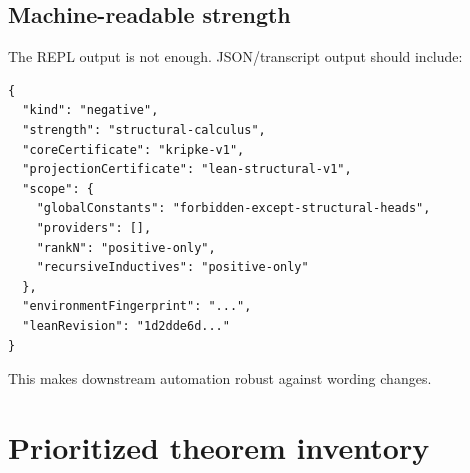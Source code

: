 \documentclass[11pt,letterpaper,openany]{report}
\theoremstyle{definition}
\theoremstyle{remark}
\begin{document}
\section{Machine-readable strength}

The REPL output is not enough. JSON/transcript output should include:

\begin{lstlisting}[caption={Illustrative result strength metadata.}]
{
  "kind": "negative",
  "strength": "structural-calculus",
  "coreCertificate": "kripke-v1",
  "projectionCertificate": "lean-structural-v1",
  "scope": {
    "globalConstants": "forbidden-except-structural-heads",
    "providers": [],
    "rankN": "positive-only",
    "recursiveInductives": "positive-only"
  },
  "environmentFingerprint": "...",
  "leanRevision": "1d2dde6d..."
}
\end{lstlisting}

This makes downstream automation robust against wording changes.

\chapter{Prioritized theorem inventory}
\label{ch:inventory}
\end{document}
